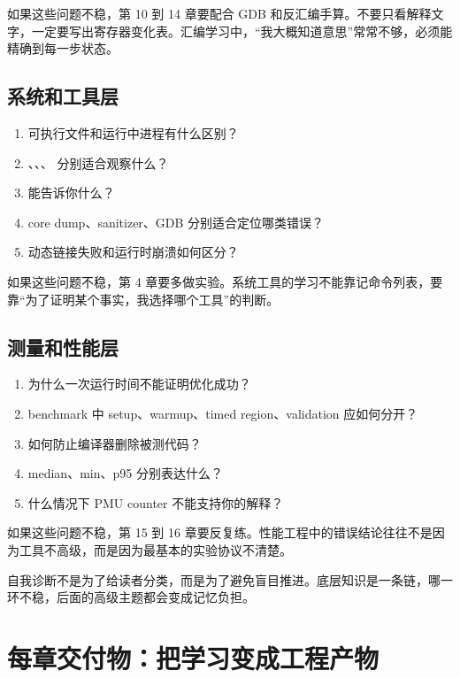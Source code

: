如果这些问题不稳，第 10 到 14 章要配合 GDB 和反汇编手算。不要只看解释文字，一定要写出寄存器变化表。汇编学习中，“我大概知道意思”常常不够，必须能精确到每一步状态。

\subsection{系统和工具层}

\begin{enumerate}
  \item 可执行文件和运行中进程有什么区别？
  \item {}、、、 分别适合观察什么？
  \item {} 能告诉你什么？
  \item core dump、sanitizer、GDB 分别适合定位哪类错误？
  \item 动态链接失败和运行时崩溃如何区分？
\end{enumerate}

如果这些问题不稳，第 4 章要多做实验。系统工具的学习不能靠记命令列表，要靠“为了证明某个事实，我选择哪个工具”的判断。

\subsection{测量和性能层}

\begin{enumerate}
  \item 为什么一次运行时间不能证明优化成功？
  \item benchmark 中 setup、warmup、timed region、validation 应如何分开？
  \item 如何防止编译器删除被测代码？
  \item median、min、p95 分别表达什么？
  \item 什么情况下 PMU counter 不能支持你的解释？
\end{enumerate}

如果这些问题不稳，第 15 到 16 章要反复练。性能工程中的错误结论往往不是因为工具不高级，而是因为最基本的实验协议不清楚。

\begin{keyidea}
自我诊断不是为了给读者分类，而是为了避免盲目推进。底层知识是一条链，哪一环不稳，后面的高级主题都会变成记忆负担。
\end{keyidea}

\section{每章交付物：把学习变成工程产物}

